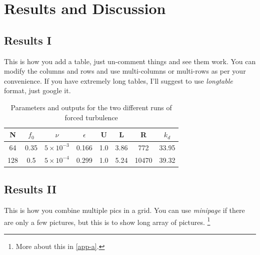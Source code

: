 \chapter{Results and Discussion}
\section{Results I}
This is how you add a table, just un-comment things and see them work. You can modify the columns and rows and use multi-columns or multi-rows as per your convenience. If you have extremely long tables, I'll suggest to use \textit{longtable} format, just google it.
\begin{table}[ht!]
    \centering
    \begin{tabular}{|c|c|c|c|c|c|c|c|}
        \hline
        N & $f_0$ & $\nu$ & $\epsilon$ & U & L & R & $k_d$ \\
        \hline
        \hline
        64 & 0.35 & $5 \times 10^{-3}$ & 0.166 & 1.0 & 3.86 & 772 & 33.95 \\
        128 & 0.5 & $5 \times 10^{-4}$ & 0.299 & 1.0 & 5.24 & 10470 & 39.32 \\
        \hline
    \end{tabular}
    \caption{Parameters and outputs for the two different runs of forced turbulence}
    \label{param-forced}
\end{table}

\newpage %

\section{Results II}
This is how you combine multiple pics in a grid. You can use \textit{minipage} if there are only a few pictures, but this is to show long array of pictures. \footnote{More about this in \autoref{app-a}.} %
